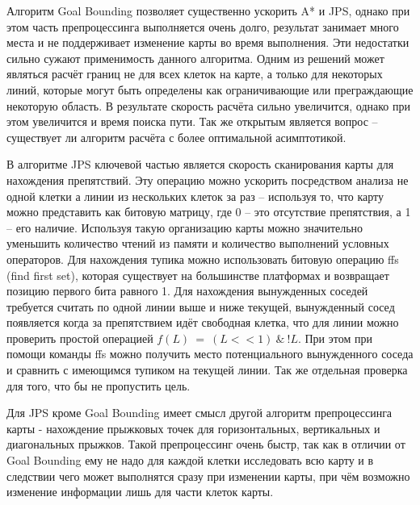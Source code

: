 Алгоритм Goal Bounding позволяет существенно ускорить A* и JPS, однако при этом часть препроцессинга выполняется очень долго, результат занимает много места и не поддерживает изменение карты во время выполнения. Эти недостатки сильно сужают применимость данного алгоритма. Одним из решений может являться расчёт границ не для всех клеток на карте, а только для некоторых линий, которые могут быть определены как ограничивающие или преграждающие некоторую область. В результате скорость расчёта сильно увеличится, однако при этом увеличится и время поиска пути. Так же открытым является вопрос -- существует ли алгоритм расчёта с более оптимальной асимптотикой.

В алгоритме JPS ключевой частью является скорость сканирования карты для нахождения препятствий. Эту операцию можно ускорить посредством анализа не одной клетки а линии из нескольких клеток за раз -- используя то, что карту можно представить как битовую матрицу, где 0 -- это отсутствие препятствия, а 1 -- его наличие. Используя такую организацию карты можно значительно уменьшить количество чтений из памяти и количество выполнений условных операторов. Для нахождения тупика можно использовать битовую операцию ffs (find first set), которая существует на большинстве платформах и возвращает позицию первого бита равного 1. Для нахождения вынужденных соседей требуется считать по одной линии выше и ниже текущей, вынужденный сосед появляется когда за препятствием идёт свободная клетка, что для линии можно проверить простой операцией $f(L)\ =\ (L<<1)\ \&\ !L$. При этом при помощи команды ffs можно получить место потенциального вынужденного соседа и сравнить с имеющимся тупиком на текущей линии. Так же отдельная проверка для того, что бы не пропустить цель.

Для JPS кроме Goal Bounding имеет смысл другой алгоритм препроцессинга карты - нахождение прыжковых точек для горизонтальных, вертикальных и диагональных прыжков. Такой препроцессинг очень быстр, так как в отличии от Goal Bounding ему не надо для каждой клетки исследовать всю карту и в следствии чего может выполнятся сразу при изменении карты, при чём возможно изменение информации лишь для части клеток карты.
